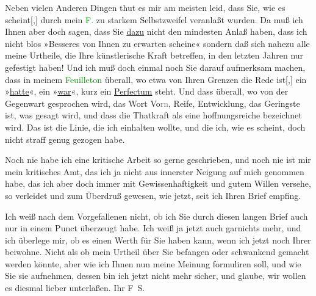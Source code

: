 \pstart
           Neben vielen Anderen Dingen thut es mir am meisten leid, dass Sie, wie es
                  scheint{[},{]} durch mein \textcolor{green}{F.}{}\ledrightnote{{$\rightarrow$}\textcolor{green}{Arthur Schnitzler und sein »Reigen«}} zu starkem Selbstzweifel veranlaßt wurden. Da muß ich
               Ihnen aber doch sagen, dass Sie \uline{dazu} nicht den
               mindesten Anlaß haben, dass ich nicht blos »Besseres von Ihnen zu erwarten scheine«
               sondern daß sich nahezu alle meine Urtheile, die Ihre künstlerische Kraft betreffen,
               in den letzten Jahren nur gefestigt haben! Und ich muß {\pb}doch einmal noch Sie darauf
               aufmerksam machen, dass in meinem \textcolor{green}{Feuilleton}{}\ledrightnote{{$\rightarrow$}\textcolor{green}{Arthur Schnitzler und sein »Reigen«}} überall, wo etwa von Ihren Grenzen die Rede
                  ist{[},{]} ein »\uline{hatte}«, ein »\uline{war}«, kurz ein \uline{Perfectum} steht. Und dass überall, wo von der Gegenwart gesprochen wird, das
               Wort Vo\textcolor{gray}{rn}, Reife, Entwicklung, das Geringste ist, was gesagt wird,
               und dass die Thatkraft als eine hoffnungsreiche bezeichnet wird. Das ist die Linie,
               die ich einhalten wollte, und die ich, wie es scheint, doch nicht straff genug
               gezogen habe.\pend
           
\pstart
           Noch nie habe ich eine kritische Arbeit so gerne geschrieben, und noch nie ist mir
               mein kritisches Amt, das ich ja nicht aus innerster Neigung auf mich genommen habe,
               das ich aber doch immer mit Gewissenhaftigkeit und gutem Willen versehe, so verleidet
               und zum Überdruß gewesen, wie jetzt, seit ich Ihren Brief empfing.\pend
           
\pstart
           Ich weiß nach dem Vorgefallenen nicht, ob ich Sie durch diesen langen Brief auch nur
               in einem Punct überzeugt habe. Ich weiß ja jetzt auch garnichts mehr, und ich
               überlege mir, ob es einen Werth für Sie haben kann, wenn ich jetzt noch Ihrer \label{K_L03353-11v}\label{K_L03353-11h} beiwohne. Nicht als ob mein Urtheil über Sie befangen oder schwankend gemacht
               werden könnte, aber wie ich Ihnen nun meine Meinung formuliren soll, und wie Sie sie
               aufnehmen, dessen bin ich jetzt nicht mehr sicher, und glaube, wir wollen es diesmal
               lieber unterlaßen.\pend
           \pstart Ihr \spacefill\mbox{F S.}\pend{}\endnumbering{}  
      